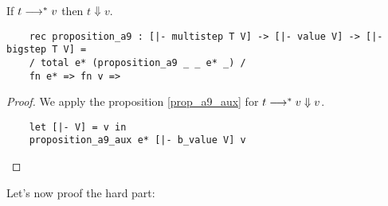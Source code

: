 \begin{proposition}[A9]
  If $t \longrightarrow^* v$ then $t \Downarrow v$.
  \begin{lstlisting}
    rec proposition_a9 : [|- multistep T V] -> [|- value V] -> [|- bigstep T V] =
    / total e* (proposition_a9 _ _ e* _) /
    fn e* => fn v =>
  \end{lstlisting}
\end{proposition}
\begin{proof}
  We apply the proposition \ref{prop_a9_aux} for $t \longrightarrow^* v
  \Downarrow v$.
  \begin{lstlisting}
    let [|- V] = v in
    proposition_a9_aux e* [|- b_value V] v
  \end{lstlisting}
\end{proof}

Let's now proof the hard part:

